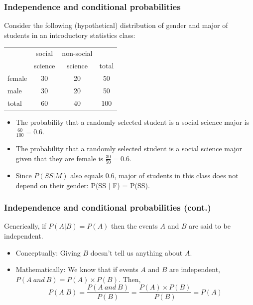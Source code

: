 \begin{frame}
\frametitle{Independence and conditional probabilities}

Consider the following (hypothetical) distribution of gender and major of students in an introductory statistics class:

{\small
\begin{center}
\begin{tabular}{l | c c | c}
			& social	& non-social 		&  \\
			& science	& science	& total \\
\hline
female		& 30		& 20		& 50 \\
male			& 30		& 20		& 50 \\
\hline
total			& 60		& 40		& 100
\end{tabular}
\end{center}
}

\pause

\begin{itemize}

\item The probability that a randomly selected student is a social science major is \pause $\frac{60}{100} = 0.6$. 

\pause

\item The probability that a randomly selected student is a social science major given that they are female is \pause $\frac{30}{50} = 0.6$. 

\pause

\item Since $P(SS | M)$ also equals 0.6, major of students in this class does not depend on their gender: P(SS $|$ F) = P(SS).

\end{itemize}

\end{frame}


\begin{frame}
\frametitle{Independence and conditional probabilities (cont.)}

Generically, if $P(A|B) = P(A)$ then the events $A$ and $B$ are said to be independent.

\pause

\begin{itemize}

\item Conceptually: Giving $B$ doesn't tell us anything about $A$.

\pause

\item Mathematically: We know that if events $A$ and $B$ are independent, $P(A~and~B) = P(A) \times P(B)$. Then,
\[ P(A|B) = \frac{P(A~and~B)}{P(B)} = \frac{P(A) \times P(B)}{P(B)} = P(A) \]

\end{itemize}

\end{frame}

